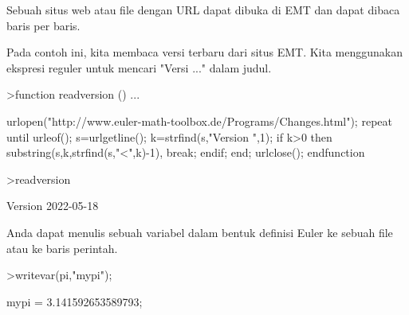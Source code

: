\documentclass[12pt,arial,letterpaper]{book}
\begin{document}
\begin{eulercomment}
\begin{eulercomment}
\begin{eulercomment}
\begin{eulercomment}
\begin{eulercomment}
\begin{eulercomment}
\begin{eulercomment}
\begin{eulercomment}
\begin{eulercomment}
\begin{eulercomment}
\begin{eulercomment}
\begin{eulercomment}
\begin{eulercomment}
\begin{eulercomment}
\begin{eulercomment}
\begin{eulercomment}
\begin{eulercomment}
\begin{eulercomment}
\begin{eulercomment}
\begin{eulercomment}
\begin{eulercomment}
\begin{eulercomment}
\begin{eulercomment}
\begin{eulercomment}
\begin{eulercomment}
\begin{eulercomment}
\begin{eulercomment}
\begin{eulercomment}
\begin{eulercomment}
\begin{eulercomment}
\begin{eulercomment}
\begin{eulercomment}
\begin{eulercomment}
\begin{eulercomment}
\begin{eulercomment}
\begin{eulercomment}
\begin{eulercomment}
\begin{eulercomment}
\begin{eulercomment}
Sebuah situs web atau file dengan URL dapat dibuka di EMT dan dapat
dibaca baris per baris.

Pada contoh ini, kita membaca versi terbaru dari situs EMT. Kita
menggunakan ekspresi reguler untuk mencari "Versi ..." dalam judul.
\end{eulercomment}
\begin{eulerprompt}
>function readversion () ...
\end{eulerprompt}
\begin{eulerudf}
  urlopen("http://www.euler-math-toolbox.de/Programs/Changes.html");
  repeat
    until urleof();
    s=urlgetline();
    k=strfind(s,"Version ",1);
    if k>0 then substring(s,k,strfind(s,"<",k)-1), break; endif;
  end;
  urlclose();
  endfunction
\end{eulerudf}
\begin{eulerprompt}
>readversion
\end{eulerprompt}
\begin{euleroutput}
  Version 2022-05-18
\end{euleroutput}
\begin{eulercomment}
Anda dapat menulis sebuah variabel dalam bentuk definisi Euler ke
sebuah file atau ke baris perintah.
\end{eulercomment}
\begin{eulerprompt}
>writevar(pi,"mypi");
\end{eulerprompt}
\begin{euleroutput}
  mypi = 3.141592653589793;
\end{euleroutput}
\begin{eulercomment}

\end{eulercomment}
\end{eulercomment}
\end{eulercomment}
\end{eulercomment}
\end{eulercomment}
\end{eulercomment}
\end{eulercomment}
\end{eulercomment}
\end{eulercomment}
\end{eulercomment}
\end{eulercomment}
\end{eulercomment}
\end{eulercomment}
\end{eulercomment}
\end{eulercomment}
\end{eulercomment}
\end{eulercomment}
\end{eulercomment}
\end{eulercomment}
\end{eulercomment}
\end{eulercomment}
\end{eulercomment}
\end{eulercomment}
\end{eulercomment}
\end{eulercomment}
\end{eulercomment}
\end{eulercomment}
\end{eulercomment}
\end{eulercomment}
\end{eulercomment}
\end{eulercomment}
\end{eulercomment}
\end{eulercomment}
\end{eulercomment}
\end{eulercomment}
\end{eulercomment}
\end{eulercomment}
\end{eulercomment}
\end{eulercomment}
\end{document}
